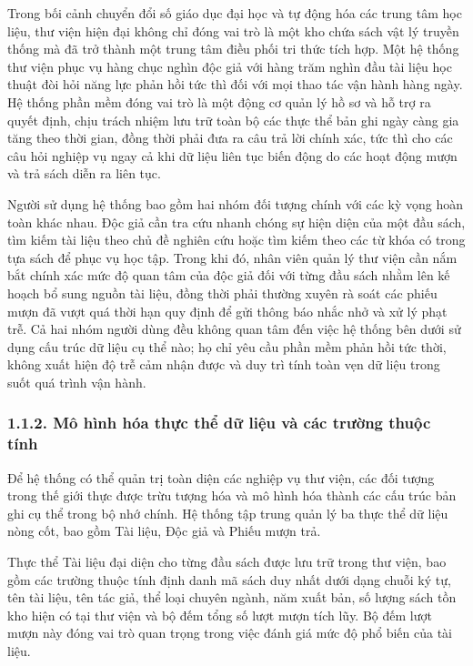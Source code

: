 \documentclass[14pt,a4paper]{extarticle}
\begin{document}
Trong bối cảnh chuyển đổi số giáo dục đại học và tự động hóa các trung tâm học liệu, thư viện hiện đại không chỉ đóng vai trò là một kho chứa sách vật lý truyền thống mà đã trở thành một trung tâm điều phối tri thức tích hợp. Một hệ thống thư viện phục vụ hàng chục nghìn độc giả với hàng trăm nghìn đầu tài liệu học thuật đòi hỏi năng lực phản hồi tức thì đối với mọi thao tác vận hành hàng ngày. Hệ thống phần mềm đóng vai trò là một động cơ quản lý hồ sơ và hỗ trợ ra quyết định, chịu trách nhiệm lưu trữ toàn bộ các thực thể bản ghi ngày càng gia tăng theo thời gian, đồng thời phải đưa ra câu trả lời chính xác, tức thì cho các câu hỏi nghiệp vụ ngay cả khi dữ liệu liên tục biến động do các hoạt động mượn và trả sách diễn ra liên tục.

Người sử dụng hệ thống bao gồm hai nhóm đối tượng chính với các kỳ vọng hoàn toàn khác nhau. Độc giả cần tra cứu nhanh chóng sự hiện diện của một đầu sách, tìm kiếm tài liệu theo chủ đề nghiên cứu hoặc tìm kiếm theo các từ khóa có trong tựa sách để phục vụ học tập. Trong khi đó, nhân viên quản lý thư viện cần nắm bắt chính xác mức độ quan tâm của độc giả đối với từng đầu sách nhằm lên kế hoạch bổ sung nguồn tài liệu, đồng thời phải thường xuyên rà soát các phiếu mượn đã vượt quá thời hạn quy định để gửi thông báo nhắc nhở và xử lý phạt trễ. Cả hai nhóm người dùng đều không quan tâm đến việc hệ thống bên dưới sử dụng cấu trúc dữ liệu cụ thể nào; họ chỉ yêu cầu phần mềm phản hồi tức thời, không xuất hiện độ trễ cảm nhận được và duy trì tính toàn vẹn dữ liệu trong suốt quá trình vận hành.

\subsubsection*{1.1.2. Mô hình hóa thực thể dữ liệu và các trường thuộc tính}

Để hệ thống có thể quản trị toàn diện các nghiệp vụ thư viện, các đối tượng trong thế giới thực được trừu tượng hóa và mô hình hóa thành các cấu trúc bản ghi cụ thể trong bộ nhớ chính. Hệ thống tập trung quản lý ba thực thể dữ liệu nòng cốt, bao gồm Tài liệu, Độc giả và Phiếu mượn trả.

Thực thể Tài liệu đại diện cho từng đầu sách được lưu trữ trong thư viện, bao gồm các trường thuộc tính định danh mã sách duy nhất dưới dạng chuỗi ký tự, tên tài liệu, tên tác giả, thể loại chuyên ngành, năm xuất bản, số lượng sách tồn kho hiện có tại thư viện và bộ đếm tổng số lượt mượn tích lũy. Bộ đếm lượt mượn này đóng vai trò quan trọng trong việc đánh giá mức độ phổ biến của tài liệu.
\end{document}

